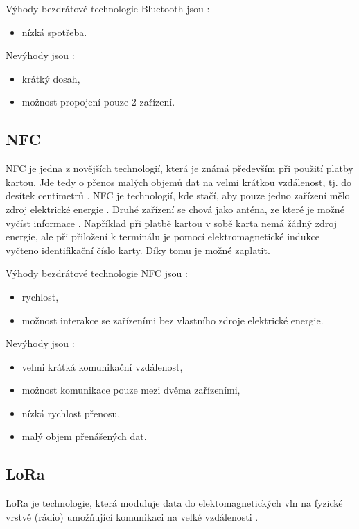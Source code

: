 Výhody bezdrátové technologie Bluetooth jsou \cite{Bezdrat_muni}:
\begin{itemize}
  \item nízká spotřeba.
\end{itemize}

Nevýhody jsou \cite{Bezdrat_muni}:
\begin{itemize}
  \item krátký dosah,
  \item možnost propojení pouze 2 zařízení.
\end{itemize}

\subsection{NFC}
NFC je jedna z novějších technologií, která je známá především při použití platby kartou. Jde tedy o přenos malých objemů dat na velmi krátkou 
vzdálenost, tj. do desítek centimetrů \cite{Bezdrat_muni}. NFC je technologií, kde stačí, aby pouze jedno zařízení mělo zdroj elektrické 
energie \cite{Bezdrat_muni}. Druhé zařízení se chová jako anténa, ze které je možné vyčíst informace \cite{Bezdrat_muni}. Například při 
platbě kartou v sobě karta nemá žádný zdroj energie, ale při přiložení k terminálu je pomocí elektromagnetické indukce vyčteno identifikační
číslo karty. Díky tomu je možné zaplatit. 

Výhody bezdrátové technologie NFC jsou \cite{Bezdrat_muni}:
\begin{itemize}
  \item rychlost,
  \item možnost interakce se zařízeními bez vlastního zdroje elektrické energie.
\end{itemize}

Nevýhody jsou \cite{Bezdrat_muni}:
\begin{itemize}
  \item velmi krátká komunikační vzdálenost,
  \item možnost komunikace pouze mezi dvěma zařízeními, 
  \item nízká rychlost přenosu,
  \item malý objem přenášených dat.
\end{itemize}

\subsection{LoRa}
LoRa je technologie, která moduluje data do elektomagnetických vln na fyzické vrstvě (rádio) umožňující komunikaci na velké vzdálenosti \cite{LoRa_eman}. 

